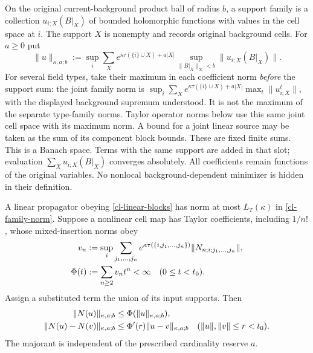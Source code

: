 On the original current-background product ball of radius $b$, a support
family is a collection $u_{i;X}(B|_X)$ of bounded holomorphic functions
with values in the cell space at $i$. The support $X$ is nonempty and
records original background cells. For $a\ge0$ put
\begin{equation}
 \|u\|_{\kappa,a;b}
 :=\sup_i\sum_X e^{\kappa\tau(\{i\}\cup X)+a|X|}
       \sup_{\|B|_X\|_\infty<b}\|u_{i;X}(B|_X)\|.             \label{cl-family-norm}
\end{equation}
For several field types, take their maximum in each coefficient norm
\emph{before} the support sum: the joint family norm is
$\sup_i\sum_X e^{\kappa\tau(\{i\}\cup X)+a|X|}
\max_t\|u^t_{i;X}\|$, with the displayed background supremum understood.
It is not the maximum of the separate type-family norms. Taylor
operator norms below use this same joint cell space with its maximum
norm. A bound for a joint linear source may be taken as the sum of its
component block bounds. These are fixed finite sums.
This is a Banach space. Terms with the same support are added in that
slot; evaluation $\sum_Xu_{i;X}(B|_X)$ converges absolutely. All
coefficients remain functions of the original variables. No nonlocal
background-dependent minimizer is hidden in their definition.

\begin{lemma}\label{cl-substitution}
A linear propagator obeying \eqref{cl-linear-blocks} has norm at most
$L_T(\kappa)$ in \eqref{cl-family-norm}. Suppose a nonlinear cell map has
Taylor coefficients, including $1/n!$, whose mixed-insertion norms obey
\begin{align}
 v_n&:=\sup_i\sum_{j_1,\ldots,j_n}
 e^{\kappa\tau(\{i,j_1,\ldots,j_n\})}
       \|N_{n;i;j_1,\ldots,j_n}\|,\notag\\
 \Phi(t)&:=\sum_{n\ge2}v_nt^n<\infty\quad(0\le t<t_0).
                                                               \label{cl-vertex-majorant}
\end{align}
Assign a substituted term the union of its input supports. Then
\begin{align}
 \|N(u)\|_{\kappa,a;b}&\le\Phi(\|u\|_{\kappa,a;b}),\notag\\
 \|N(u)-N(v)\|_{\kappa,a;b}&\le\Phi'(r)\|u-v\|_{\kappa,a;b}
 \quad(\|u\|,\|v\|\le r<t_0).                              \label{cl-substitution-bound}
\end{align}
The majorant is independent of the prescribed cardinality reserve $a$.
\end{lemma}

